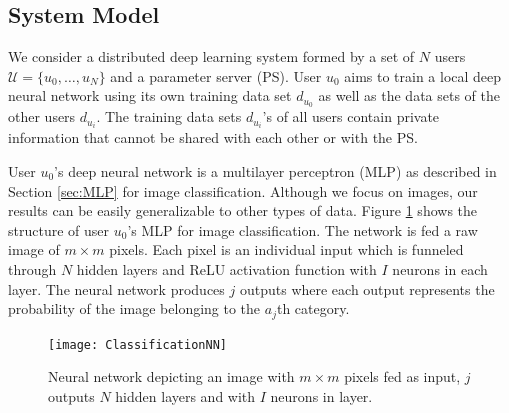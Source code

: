 \documentclass[conference]{IEEEtran}
\begin{document}
\subsection{System Model} \label{sec:systemModel}

We consider a distributed deep learning system formed by a set of $N$ users $\mathcal{U}= \{u_0, \dots,u_N\}$ and
a parameter server (PS). User $u_0$ aims to train a local deep neural network using its own training data set
$d_{u_0}$ as well as the data sets of the other users $d_{u_i}$. %
The training data sets $d_{u_i}$'s of all users contain private information that cannot be shared with each other or with the PS.  

User $u_0$'s deep neural network is a multilayer perceptron (MLP) as described in Section \ref{sec:MLP} for image classification.
Although we focus on images, our results can be easily generalizable to other types of data. 
Figure \ref{fig:ClassNN} shows the structure of user $u_0$'s MLP for image classification. The network is fed a raw image of  $m
\times m$ pixels. Each pixel is an individual input which is funneled through $N$ hidden layers and ReLU activation function with $I$
neurons in each layer. The neural network produces $j$ outputs where each output represents the probability of the image belonging to
the $a_j$th category. 
\begin{figure}[!h]
\texttt{[image: ClassificationNN]}
\caption{Neural network depicting an image with $m \times m$ pixels fed as input, $j$ outputs  $N$  hidden layers and with $I$ neurons in layer.}
\label{fig:ClassNN}
\end{figure}
\end{document}
